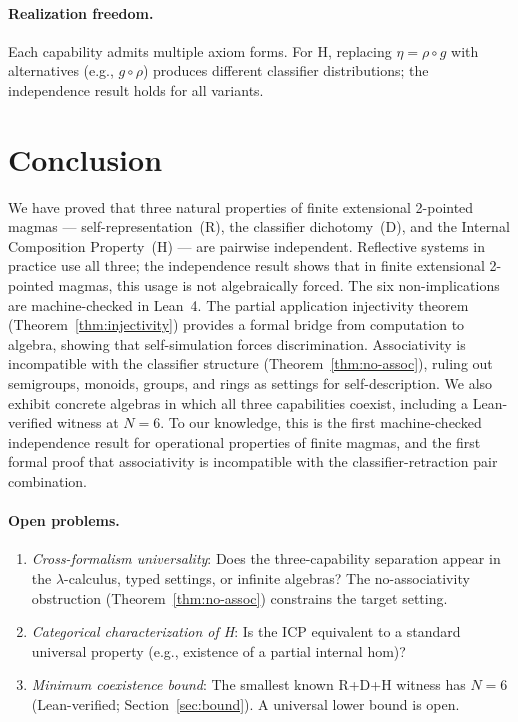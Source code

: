 \documentclass[a4paper,UKenglish,cleveref,autoref,thm-restate]{lipics-v2021}
\begin{document}
\paragraph{Realization freedom.}
Each capability admits multiple axiom forms. For H, replacing $\eta = \rho \circ g$ with alternatives (e.g., $g \circ \rho$) produces different classifier distributions; the independence result holds for all variants.

\section{Conclusion}

We have proved that three natural properties of finite extensional 2-pointed magmas --- self-representation~(R), the classifier dichotomy~(D), and the Internal Composition Property~(H) --- are pairwise independent. Reflective systems in practice use all three; the independence result shows that in finite extensional 2-pointed magmas, this usage is not algebraically forced. The six non-implications are machine-checked in Lean~4. The partial application injectivity theorem (Theorem~\ref{thm:injectivity}) provides a formal bridge from computation to algebra, showing that self-simulation forces discrimination. Associativity is incompatible with the classifier structure (Theorem~\ref{thm:no-assoc}), ruling out semigroups, monoids, groups, and rings as settings for self-description. We also exhibit concrete algebras in which all three capabilities coexist, including a Lean-verified witness at $N\!=\!6$. To our knowledge, this is the first machine-checked independence result for operational properties of finite magmas, and the first formal proof that associativity is incompatible with the classifier-retraction pair combination.

\paragraph{Open problems.}
\begin{enumerate}
  \item \emph{Cross-formalism universality}: Does the three-capability separation appear in the $\lambda$-calculus, typed settings, or infinite algebras? The no-associativity obstruction (Theorem~\ref{thm:no-assoc}) constrains the target setting.
  \item \emph{Categorical characterization of H}: Is the ICP equivalent to a standard universal property (e.g., existence of a partial internal hom)?
  \item \emph{Minimum coexistence bound}: The smallest known R+D+H witness has $N\!=\!6$ (Lean-verified; Section~\ref{sec:bound}). A universal lower bound is open.
\end{enumerate}
\end{document}

